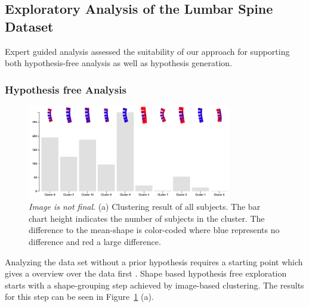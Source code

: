 \documentclass[journal]{style/vgtc} 			          %
\begin{document}
\subsection{Exploratory Analysis of the Lumbar Spine Dataset}
%
Expert guided analysis assessed the suitability of our approach for supporting both hypothesis-free analysis as well as hypothesis generation.
%
\subsubsection{Hypothesis free Analysis} \label{Hypothesis free Analysis}
\begin{figure}[htb]
 \centering
 \includegraphics[width=3.5in]{figures/hypothesisfree}
 \caption{\emph{Image is not final}. (a) Clustering result of all subjects. The bar chart height indicates the number of subjects in the cluster. The difference to the mean-shape is color-coded where blue represents no difference and red a large difference.}
 \label{fig:hypothesisfree}
\end{figure}
%
Analyzing the data set without a prior hypothesis requires a starting point which gives a overview over the data first \cite{Shneiderman1996}.
%
Shape based hypothesis free exploration starts with a shape-grouping step achieved by image-based clustering.
%
The results for this step can be seen in Figure~\ref{fig:hypothesisfree} (a).
\end{document}
